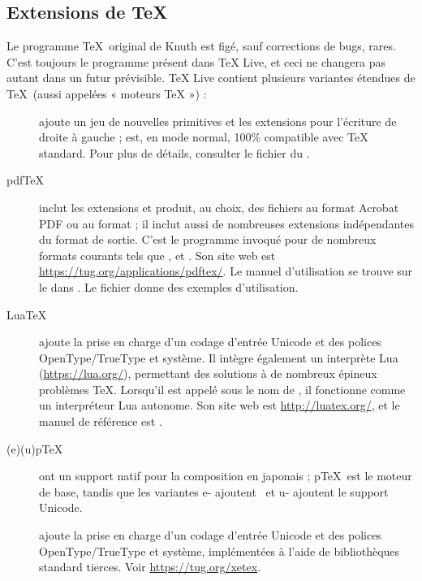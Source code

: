 \documentclass[german, english, french]{article}
\renewcommand{\TL}{\TeX{} Live\xspace}%
\begin{document}
\subsection{Extensions de \protect\TeX}
\label{sec:tex-extensions}

Le programme \TeX\ original de Knuth est figé, sauf corrections de bugs,
rares. C'est toujours le programme  présent dans \TL, et ceci ne
changera pas autant dans un futur prévisible. \TL contient plusieurs variantes
étendues de \TeX\ (aussi appelées « moteurs \TeX{} ») :

\begin{description}

\item [\eTeX{}] \label{text:etex} ajoute un jeu de nouvelles primitives et les
  extensions \TeXXeT{} pour l'écriture de droite à gauche ; \eTeX{} est, en mode
  normal, 100\% compatible avec \TeX{} standard.  Pour plus de détails, consulter
  le fichier  du \DVD{}.

\item[pdf\TeX{}] inclut les extensions \eTeX{} et produit, au choix, des
  fichiers au format Acrobat PDF ou au format \dvi{} ; il inclut aussi de
  nombreuses extensions indépendantes du format de sortie. C'est le programme
  invoqué pour de nombreux formats courants tels que , 
  et . Son site web est
  \url{https://tug.org/applications/pdftex/}.  Le manuel d'utilisation se trouve
  sur le \DVD{} dans . Le
  fichier  donne des
  exemples d'utilisation.

\item[Lua\TeX] ajoute la prise en charge d'un codage d'entrée Unicode et des
  polices OpenType/TrueType et système. Il intègre également un interprète Lua
  (\url{https://lua.org/}), permettant des solutions à de nombreux épineux
  problèmes \TeX{}. Lorsqu'il est appelé sous le nom de , il
  fonctionne comme un interpréteur Lua autonome. Son site web est
  \url{http://luatex.org/}, et le manuel de référence est
  .

\item[(e)(u)p\TeX] ont un support natif pour la composition en japonais ; p\TeX\
  est le moteur de base, tandis que les variantes e- ajoutent \eTeX\ et u-
  ajoutent le support Unicode.

\item[\XeTeX] ajoute la prise en charge d'un codage d'entrée Unicode et des
  polices OpenType/TrueType et système, implémentées à l'aide de bibliothèques
  standard tierces. Voir \url{https://tug.org/xetex}.


\end{description}
\end{document}

